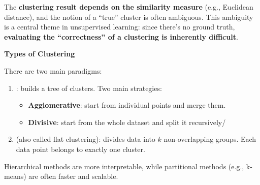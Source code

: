 \highspace
The \textbf{clustering result depends on the similarity measure} (e.g., Euclidean distance), and the notion of a ``true'' cluster is often ambiguous. This ambiguity is a central theme in unsupervised learning: since there's no ground truth, \textbf{evaluating the ``correctness'' of a clustering is inherently difficult}.

\highspace
\begin{flushleft}
    \textcolor{Green3}{ \textbf{Types of Clustering}}
\end{flushleft}
There are two main paradigms:
\begin{enumerate}
    \item {}: builds a tree of clusters. Two main strategies:
    \begin{itemize}
        \item \textbf{Agglomerative}: start from individual points and merge them.
        \item \textbf{Divisive}: start from the whole dataset and split it recursively/
    \end{itemize}

    \item\label{def: Partitional Clustering}  (also called flat clustering): divides data into $k$ non-overlapping groups. Each data point belongs to exactly one cluster.
\end{enumerate}
Hierarchical methods are more interpretable, while partitional methods (e.g., k-means) are often faster and scalable.
